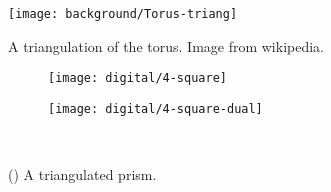 \begin{figure}[htb]
\centering
\texttt{[image: background/Torus-triang]}
\caption{A triangulation of the torus. Image from wikipedia.}
\label{fig:triangulated-torus}
\end{figure}

\begin{figure}[htb]
        \centering
        \begin{subfigure}[b]{0.25\textwidth}
        \texttt{[image: digital/4-square]}
        \caption{}
          \label{fig:4-square}
        \end{subfigure}
          \hspace{.3cm}
         \begin{subfigure}[b]{0.25\textwidth}
        \texttt{[image: digital/4-square-dual]}
        \caption{}
        \label{fig:4-square-dual}
        \end{subfigure}\\
		\caption{() A triangulated prism.
		\label{fig:genus}}
\end{figure}
